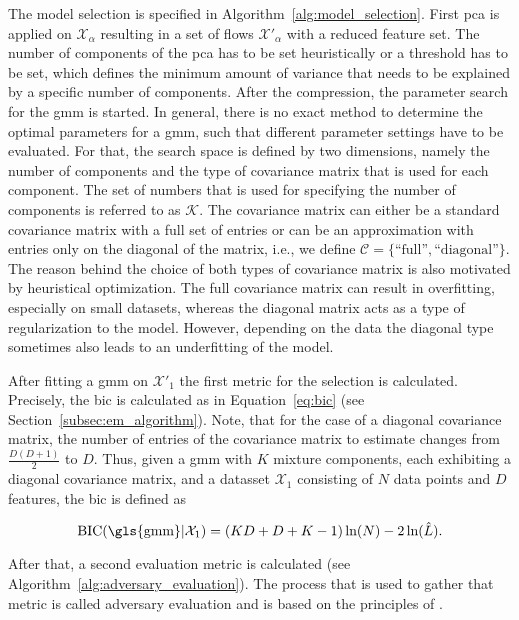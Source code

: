 \documentclass[../../main.tex]{subfiles}
\begin{document}
 The model selection is specified in Algorithm~\ref{alg:model_selection}. First \gls{pca} is applied on $\mathcal{X}_\alpha$ resulting in a set of flows $\mathcal{X}'_\alpha$ with a reduced feature set. The number of components of the \gls{pca} has to be set heuristically or a threshold has to be set, which defines the minimum amount of variance that needs to be explained by a specific number of components. After the compression, the parameter search for the \gls{gmm} is started. In general, there is no exact method to determine the optimal parameters for a \gls{gmm}, such that different parameter settings have to be evaluated. For that, the search space is defined by two dimensions, namely the number of components and the type of covariance matrix that is used for each component. The set of numbers that is used for specifying the number of components is referred to as $\mathcal{K}$. The covariance matrix can either be a standard covariance matrix with a full set of entries or can be an approximation with entries only on the diagonal of the matrix, i.e., we define $\mathcal{C} = \{\text{``full''}, \text{``diagonal''}\}$. The reason behind the choice of both types of covariance matrix is also motivated by heuristical optimization. The full covariance matrix can result in overfitting, especially on small datasets, whereas the diagonal matrix acts as a type of regularization to the model. However, depending on the data the diagonal type sometimes also leads to an underfitting of the model.

 After fitting a \gls{gmm} on $\mathcal{X}'_1$ the first metric for the selection is calculated. Precisely, the \gls{bic} is calculated as in Equation~\ref{eq:bic} (see Section~\ref{subsec:em_algorithm}). Note, that for the case of a diagonal covariance matrix, the number of entries of the covariance matrix to estimate changes from $\frac{D(D+1)}{2}$ to $D$. Thus, given a \gls{gmm} with $K$ mixture components, each exhibiting a diagonal covariance matrix, and a datasset $\mathcal{X}_1$ consisting of $N$ data points and $D$ features, the \gls{bic} is defined as

 \begin{equation}
     \text{BIC}(\text{\gls{gmm}}|\mathcal{X}_1) = (KD+D+K-1) \, \text{ln}(N) - 2 \, \text{ln}(\hat{L}).
 \end{equation}

 After that, a second evaluation metric is calculated (see Algorithm~\ref{alg:adversary_evaluation}). The process that is used to gather that metric is called adversary evaluation and is based on the principles of .
\end{document}
